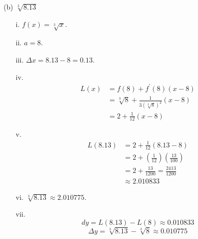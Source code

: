 \documentclass[nooutcomes]{ximera}
\begin{document}
\begin{problem}
\begin{freeResponse}
		(b)  $ \sqrt[3]{8.13}$
			\begin{enumerate}
			\item[i.]  $f(x) = \sqrt[3]{x}$.
			\item[ii.]  $a=8$.
			\item[iii.]  $\Delta x = 8.13 - 8 = 0.13$.
			\item[iv.]  
				\begin{align*}
				L(x) &= f(8) + f^\prime (8) (x-8) \\
				&= \sqrt[3]{8} + \frac{1}{3 (\sqrt[3]{8})^2} \left( x - 8 \right) \\
				&= 2 + \frac{1}{12} (x-8) 
				\end{align*}
			\item[v.]  
				\begin{align*}
				L(8.13) &= 2 + \frac{1}{12} (8.13 - 8) \\
				&= 2 + \left( \frac{1}{12} \right) \left( \frac{13}{100} \right) \\
				&= 2 + \frac{13}{1200} = \frac{2413}{1200} \\
				&\approx 2.010833
				\end{align*}
			\item[vi.]  $\sqrt[3]{8.13} \approx 2.010775$.
			\item[vii.]  
			$$ dy = L(8.13) - L(8) \approx 0.010833 $$
			$$ \Delta y = \sqrt[3]{8.13} - \sqrt[3]{8} \approx 0.010775 $$
			\end{enumerate}
		\end{freeResponse}
		
		
\end{problem}
\end{document}
